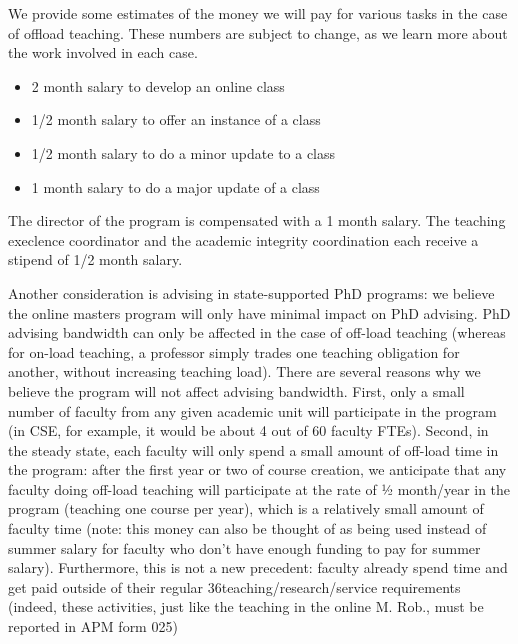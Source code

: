 \documentclass[11pt,letterpaper]{article}
\begin{document}
We provide some estimates of the money we will pay for various tasks
in the case of offload teaching. These numbers are subject to change,
as we learn more about the work involved in each case.

\begin{itemize}
\item 2 month salary to develop an online class
\item 1/2 month salary to offer an instance of a class
\item 1/2 month salary to do a minor update to a class
\item 1 month salary to do a major update of a class
\end{itemize}

The director of the program is compensated with a 1 month salary. The
teaching execlence coordinator and the academic integrity coordination
each receive a stipend of 1/2 month salary.

Another consideration is advising in state-supported PhD programs: we
believe the online masters program will only have minimal impact on
PhD advising. PhD advising bandwidth can only be affected in the case
of off-load teaching (whereas for on-load teaching, a professor simply
trades one teaching obligation for another, without increasing
teaching load). There are several reasons why we believe the program
will not affect advising bandwidth. First, only a small number of
faculty from any given academic unit will participate in the program
(in CSE, for example, it would be about 4 out of 60 faculty FTEs).
Second, in the steady state, each faculty will only spend a small
amount of off-load time in the program: after the first year or two of
course creation, we anticipate that any faculty doing off-load
teaching will participate at the rate of 1⁄2 month/year in the program
(teaching one course per year), which is a relatively small amount of
faculty time (note: this money can also be thought of as being used
instead of summer salary for faculty who don’t have enough funding to
pay for summer salary). Furthermore, this is not a new precedent:
faculty already spend time and get paid outside of their regular
36teaching/research/service requirements (indeed, these activities,
just like the teaching in the online M. Rob., must be reported in APM
form 025)
\end{document}
